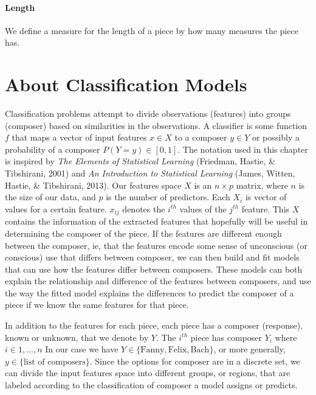\documentclass[12pt,twoside]{reedthesis}
\theoremstyle{definition}
\theoremstyle{definition}
\theoremstyle{definition}
\theoremstyle{remark}
\begin{document}
\subsubsection{Length}\label{length}

We define a measure for the length of a piece by how many measures the
piece has.

\chapter{About Classification Models}\label{about-classification-models}

Classification problems attempt to divide observations (features) into
groups (composer) based on similarities in the observations. A
classifier is some function \(f\) that maps a vector of input features
\(x \in X\) to a composer \(y \in Y\) or possibly a probability of a
composer \(P(Y = y) \in [0,1]\). The notation used in this chapter is
inspired by \emph{The Elements of Statistical Learning} (Friedman,
Hastie, \& Tibshirani, 2001) and \emph{An Introduction to Statistical
Learning} (James, Witten, Hastie, \& Tibshirani, 2013). Our features
space \(X\) is an \(n \times p\) matrix, where \(n\) is the size of our
data, and \(p\) is the number of predictors. Each \(X_i\) is vector of
values for a certain feature. \(x_{ij}\) denotes the \(i^{th}\) values
of the \(j^{th}\) feature. This \(X\) contains the information of the
extracted features that hopefully will be useful in determining the
composer of the piece. If the features are different enough between the
composer, ie, that the features encode some sense of unconscious (or
conscious) use that differs between composer, we can then build and fit
models that can use how the features differ between composers. These
models can both explain the relationship and difference of the features
between composers, and use the way the fitted model explains the
differences to predict the composer of a piece if we know the same
features for that piece.

In addition to the features for each piece, each piece has a composer
(response), known or unknown, that we denote by \(Y\). The \(i^{th}\)
piece has composer \(Y_i\) where \(i \in 1, \ldots, n\) In our case we
have \(Y \in \{\text{Fanny},\text{Felix}, \text{Bach}\}\), or more
generally, \(y \in \{\text{list of composers}\}\). Since the options for
composer are in a discrete set, we can divide the input features space
into different groups, or regions, that are labeled according to the
classification of composer a model assigns or predicts.
\end{document}
